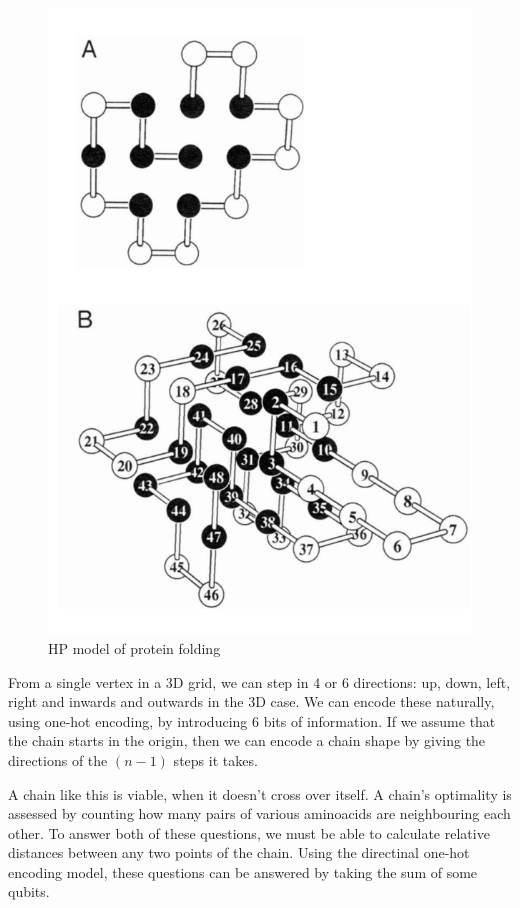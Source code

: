 \begin{figure}
    \centering
    \includegraphics{content/assets/02_introduction/hp_model.png}
    \caption{HP model of protein folding}
    \label{fig:my_label}
\end{figure}

From a single vertex in a 3D grid, we can step in $4$ or $6$ directions: up, down, left, right and inwards and outwards in the 3D case. We can encode these naturally, using one-hot encoding, by introducing $6$ bits of information. If we assume that the chain starts in the origin, then we can encode a chain shape by giving the directions of the $(n-1)$ steps it takes.

A chain like this is viable, when it doesn't cross over itself. A chain's optimality is assessed by counting how many pairs of various aminoacids are neighbouring each other. To answer both of these questions, we must be able to calculate relative distances between any two points of the chain. Using the directinal one-hot encoding model, these questions can be answered by taking the sum of some qubits.

